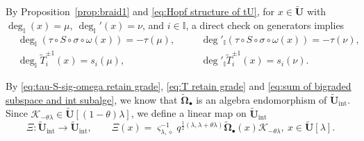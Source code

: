 \documentclass[a4paper,reqno,12pt]{amsart}
\numberwithin{equation}{section}
\theoremstyle{definition}
\theoremstyle{plain}
\theoremstyle{definition}
\def\I{\mathbb I}
\def\tU{\widetilde{\mathbf U}}
\def\tTD{\widetilde T}
\def\cK{\mathcal K}
\def\vs{\varsigma}
\def\dm{\diamond}
\def \wObb{\widetilde{\mathbf{\Omega}}_\bullet}
\begin{document}
By Proposition~\ref{prop:braid1} and \eqref{eq:Hopf structure of tU}, for $x\in\tU$ with $\deg_\I(x)=\mu,\ \deg_\I'(x)=\nu$, and $i\in\I$, a direct check on generators implies
\begin{align}
&\deg_\I(\tau\circ S\circ\sigma\circ\omega(x))=-\tau(\mu),\quad&&\deg'_\I(\tau\circ S\circ\sigma\circ\omega(x))=-\tau(\nu),\label{eq:tau-S-sig-omega retain grade}\\
  &\deg_\I\tTD_i^{\pm1}(x)=s_i(\mu),\quad && \deg'_\I\tTD_i^{\pm1}(x)=s_i(\nu).\label{eq:T retain grade}
\end{align}

By \eqref{eq:tau-S-sig-omega retain grade}, \eqref{eq:T retain grade} and \eqref{eq:sum of bigraded subspace and int subalge}, we know that $\wObb$ is an algebra endomorphism of $\tU_{\text{int}}$. Since $\cK_{-\theta\lambda}\in\tU[(1-\theta)\lambda]$, we define a linear map on $\tU_{\text{int}}$ 
\begin{equation}\label{eq:formula of Xi}
  \Xi:\tU_{\text{int}}\longrightarrow\tU_{\text{int}},\qquad \Xi(x)=\vs_{\lambda,\dm}^{-1}q^{\frac{1}{2}(\lambda,\lambda+\theta\lambda)}\wObb(x)\cK_{-\theta\lambda},\ x\in\tU[\lambda].
\end{equation}
 
\end{document}
